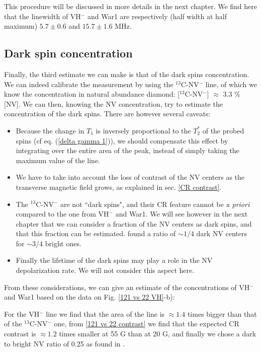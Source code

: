 \documentclass[a4paper, 11pt]{report}
\begin{document}
This procedure will be discussed in more details in the next chapter. We find here that the linewidth of VH$^-$ and War1 are respectively (half width at half maximum) $5.7\pm 0.6$ and $15.7\pm 1.6$ MHz.
\subsection{Dark spin concentration}

Finally, the third estimate we can make is that of the dark spins concentration. We can indeed calibrate the measurement by using the $^{13}$C-NV$^-$ line, of which we know the concentration in natural abundance diamond: [$^{13}$C-NV$^-$] $\approx$ 3.3 \% [NV]. We can then, knowing the NV concentration, try to estimate the concentration of the dark spins. There are however several caveats:

\begin{itemize}
\item Because the change in $T_1$ is inversely proportional to the $T_2^*$ of the probed spins (cf eq. (\ref{delta gamma 1})), we should compensate this effect by integrating over the entire area of the peak, instead of simply taking the maximum value of the line.
\item We have to take into account the loss of contrast of the NV centers as the transverse magnetic field grows, as explained in sec. \ref{CR contrast}.
\item The $^{13}$C-NV$^-$ are not ``dark spins", and their CR feature cannot be \textit{a priori} compared to the one from VH$^-$ and War1. We will see however in the next chapter that we can consider a fraction of the NV centers as dark spins, and that this fraction can be estimated. \citep{choi2017depolarization} found a ratio of $\sim 1/4$ dark NV centers for $\sim 3/4$ bright ones.
\item Finally the lifetime of the dark spins may play a role in the NV depolarization rate. We will not consider this aspect here.
\end{itemize}

From these considerations, we can give an estimate of the concentrations of VH$^-$ and War1 based on the data on Fig. \ref{121 vs 22 VH}-b): 

For the VH$^-$ line we find that the area of the line is $\approx 1.4$ times bigger than that of the $^{13}$C-NV$^-$ one, from \ref{121 vs 22 contrast} we find that the expected CR contrast is $\approx 1.2$ times smaller at 55 G than at 20 G, and finally we chose a dark to bright NV ratio of 0.25 as found in \citep{choi2017depolarization}.
\end{document}
